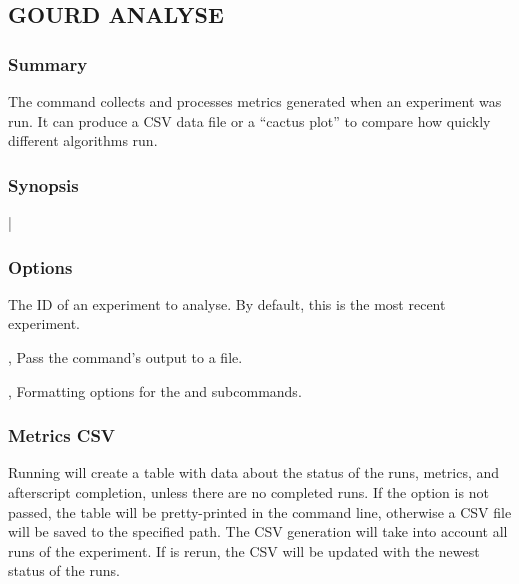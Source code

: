 \documentclass[a4paper,english]{article}
\begin{document}
\begin{adjustwidth}{18pt}{0pt}
        \subsection{GOURD ANALYSE}

            \subsubsection{Summary}
                The   command collects and processes metrics generated
                when an experiment was run. It can produce a CSV data file or a ``cactus plot''
                to compare how quickly different algorithms run.

            \subsubsection{Synopsis}
                 
                |

            \subsubsection{Options}
                \begin{Description}[Options]
                    \item[\Arg{experiment-id}]
                        The ID of an experiment to analyse.
                        By default, this is the most recent experiment.
                    \item[\OptArg{-o}{ path/to/file}, \OptArg{\ddash output}{ path/to/file}]
                        Pass the command's output to a file.
                    \item[\OptArg{-f}{ format options}, \OptArg{\ddash format}{ format options}]
                        Formatting options for the  and  subcommands.
                \end{Description}

            \subsubsection{Metrics CSV}
                Running    will create a table with
                data about the status of the runs, metrics, and afterscript completion, unless there
                are no completed runs.
                If the  option is not passed, the table will be pretty-printed in the 
                command line, otherwise a CSV file will be saved to the specified path.
                The CSV generation will take into account all runs of the experiment. If 
                 is rerun, the CSV will be updated with the newest status of the runs.


\end{adjustwidth}
\end{document}
